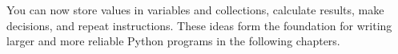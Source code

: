 \begin{tcolorbox}[title=Part II summary,colframe=orange,colback=white,arc=2mm]
You can now store values in variables and collections, calculate results, make
decisions, and repeat instructions. These ideas form the foundation for writing
larger and more reliable Python programs in the following chapters.
\end{tcolorbox}

